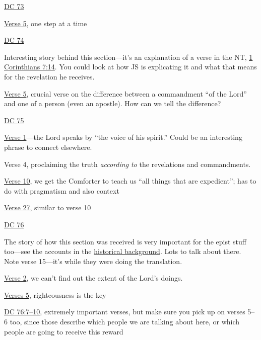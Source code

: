 \begin{compactdesc}
			\item \hyperref[DC73]{DC 73}
				\begin{compactitem}
					\item \hyperref[DC73-5]{Verse 5}, one step at a time
				\end{compactitem} 
			\item \hyperref[DC74]{DC 74}
				\begin{compactitem}
					\item Interesting story behind this section---it's an explanation of a verse in the NT, \hyperref[1CORINTHIANS-7-14]{1 Corinthians 7:14}. You could look at how JS is explicating it and what that means for the revelation he receives.
					\item \hyperref[DC74-5]{Verse 5}, crucial verse on the difference between a commandment ``of the Lord'' and one of a person (even an apostle). How can we tell the difference?
				\end{compactitem}
			\item \hyperref[DC75]{DC 75}
				\begin{compactitem}
					\item \hyperref[DC75-1]{Verse 1}---the Lord speaks by ``the voice of his spirit.'' Could be an interesting phrase to connect elsewhere.
					\item Verse 4, proclaiming the truth \textit{according to} the revelations and commandments.
					\item \hyperref[DC75-10]{Verse 10}, we get the Comforter to teach us ``all things that are expedient''; has to do with pragmatism and also context
					\item \hyperref[DC75-27]{Verse 27}, similar to verse 10
				\end{compactitem}
			\item \hyperref[DC76]{DC 76}
				\begin{compactitem}
					\item The story of how this section was received is very important for the epist stuff too---see the accounts in the \hyperref[DC76-HB]{historical background}. Lots to talk about there. Note verse 15---it's while they were doing the translation.
					\item \hyperref[DC76-2]{Verse 2}, we can't find out the extent of the Lord's doings.
					\item \hyperref[DC76-5]{Verses 5}, righteousness is the key
					\item \hyperref[DC76-7]{DC 76:7--10}, extremely important verses, but make sure you pick up on verses 5--6 too, since those describe which people we are talking about here, or which people are going to receive this reward

\end{compactitem}
\end{compactdesc}
